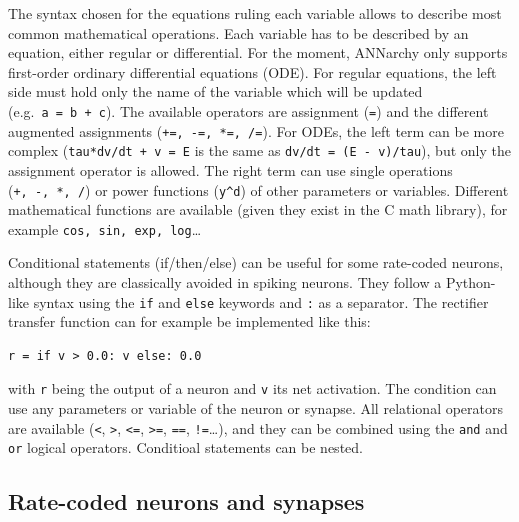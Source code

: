 \documentclass[
  11pt,
  a4paper,
]{scrbook}
\begin{document}
The syntax chosen for the equations ruling each variable allows to
describe most common mathematical operations. Each variable has to be
described by an equation, either regular or differential. For the
moment, ANNarchy only supports first-order ordinary differential
equations (ODE). For regular equations, the left side must hold only the
name of the variable which will be updated
(e.g.~\texttt{a\ =\ b\ +\ c}). The available operators are assignment
(\texttt{=}) and the different augmented assignments
(\texttt{+=,\ -=,\ *=,\ /=}). For ODEs, the left term can be more
complex (\texttt{tau*dv/dt\ +\ v\ =\ E} is the same as
\texttt{dv/dt\ =\ (E\ -\ v)/tau}), but only the assignment operator is
allowed. The right term can use single operations
(\texttt{+,\ -,\ *,\ /}) or power functions (\texttt{y\^{}d}) of other
parameters or variables. Different mathematical functions are available
(given they exist in the C math library), for example
\texttt{cos,\ sin,\ exp,\ log}\ldots{}

Conditional statements (if/then/else) can be useful for some rate-coded
neurons, although they are classically avoided in spiking neurons. They
follow a Python-like syntax using the \texttt{if} and \texttt{else}
keywords and \texttt{:} as a separator. The rectifier transfer function
can for example be implemented like this:

\begin{verbatim}
r = if v > 0.0: v else: 0.0
\end{verbatim}

with \texttt{r} being the output of a neuron and \texttt{v} its net
activation. The condition can use any parameters or variable of the
neuron or synapse. All relational operators are available
(\texttt{\textless{}}, \texttt{\textgreater{}}, \texttt{\textless{}=},
\texttt{\textgreater{}=}, \texttt{==}, \texttt{!=}\ldots), and they can
be combined using the \texttt{and} and \texttt{or} logical operators.
Conditioal statements can be nested.

\subsection{Rate-coded neurons and
synapses}\label{sec-rate-coded-neurons-and-synapses}
\end{document}
